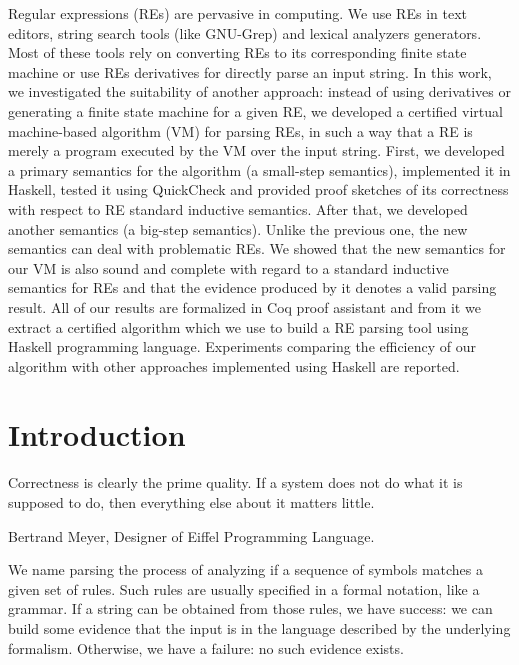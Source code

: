 \documentclass[oneside,12pt]{scrbook}
\theoremstyle{definition}
\theoremstyle{plain}
\theoremstyle{definition}
\begin{document}
Regular expressions (REs) are pervasive in computing. We use REs in text editors, string search tools (like GNU-Grep) and lexical analyzers generators. Most of these tools rely on converting REs to its corresponding finite state machine or use REs derivatives for directly parse an input string. In this work, we investigated the suitability of another approach: instead of using derivatives or generating a finite state machine for a given RE, we developed a certified virtual machine-based algorithm (VM) for parsing REs, in such a way that a RE is merely a program executed by the VM over the input string. First, we developed a primary semantics for the algorithm (a small-step semantics), implemented it in Haskell, tested it using QuickCheck and provided proof sketches of its correctness with respect to RE standard inductive semantics. After that, we developed another semantics (a big-step semantics). Unlike the previous one, the new semantics can deal with problematic REs. We showed that the new semantics for our VM is also sound and complete with regard to a standard inductive semantics for REs and that the evidence produced by it denotes a valid parsing result. All of our results are formalized in Coq proof assistant and from it we extract a certified algorithm which we use to build a RE parsing tool using Haskell programming language. Experiments comparing the efficiency of our algorithm with other approaches implemented using Haskell are reported.


\mainmatter

\chapter{Introduction}\label{chapter:introduction}

\epigraph{Correctness is clearly the prime quality. If a system does
  not do what it is supposed to do, then everything else about it
  matters little.}{Bertrand Meyer, Designer of Eiffel Programming Language.}


We name parsing the process of analyzing if a sequence of symbols matches a given set of rules.
Such rules are usually specified in a formal notation, like a grammar. If a string can be obtained
from those rules, we have success: we can build some evidence that the input is in the language
described by the underlying formalism. Otherwise, we have a failure: no such evidence exists.
\end{document}
